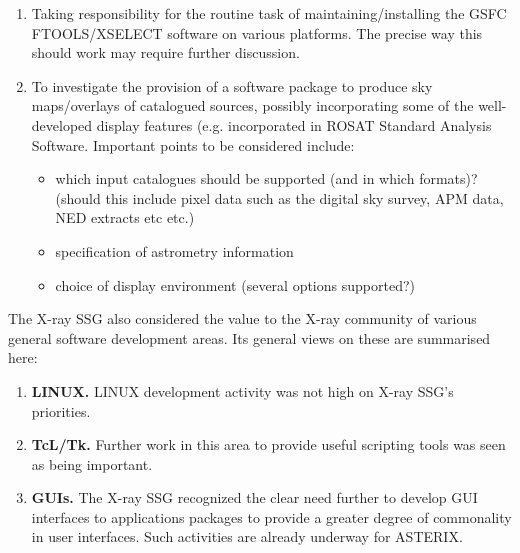 \begin{enumerate}
\item Taking responsibility for the routine task of maintaining/installing
the GSFC FTOOLS/XSELECT software on various platforms. The precise way
this should work may require further discussion.

\item To investigate the provision of a software package to produce sky
maps/overlays of catalogued sources, possibly incorporating some of
the well-developed display features (e.g. incorporated in ROSAT
Standard Analysis Software. Important points to be considered include:

\begin{itemize}
\item which input catalogues should be supported (and in which formats)?
(should this include pixel data such as the digital sky survey, APM
data, NED extracts etc etc.)

\item specification of astrometry information

\item choice of display environment (several options supported?)
\end{itemize}

\end{enumerate}

The X-ray SSG also considered the value to the X-ray community of
various general software development areas. Its general views on these
are summarised here:

\begin{enumerate}
\item {\label{xraySSG:PC}\bf LINUX.} LINUX development activity was
not high on X-ray SSG's priorities.

\item {\label{xraySSG:cl}\bf TcL/Tk.} Further work in this area to
provide useful scripting tools was seen as being important.

\item {\label{xraySSG:GUI}\bf GUIs.} The X-ray SSG recognized the clear
need further to develop GUI interfaces to applications packages to
provide a greater degree of commonality in user interfaces. Such
activities are already underway for ASTERIX.

\end{enumerate}


